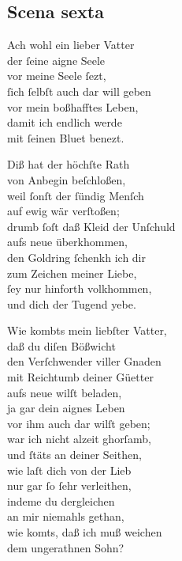 \documentclass{ees}
\newenvironment{lyrics}[1]{%
  \subsection{#1}\nopagebreak%
  \begin{lyricslist}%
  \let\voice\item%
}{%
  \end{lyricslist}%
}
\newcommand\voiceSohn{\voice[Sohn]}
\newcommand\voiceGehorsame{\voice[Geh. Sohn]}
\newcommand\voiceVater{\voice[Vatter]}
\begin{document}
\clearpage
\begin{lyrics}{Scena sexta}
  \voiceSohn
  Ach wohl ein lieber Vatter\\
  der ſeine aigne Seele\\
  vor meine Seele ſezt,\\
  ſich ſelbſt auch dar will geben\\
  vor mein boßhafftes Leben,\\
  damit ich endlich werde\\
  mit ſeinen Bluet benezt.

  \voiceVater
  Diß hat der höchſte Rath\\
  von Anbegin beſchloßen,\\
  weil ſonſt der ſündig Menſch\\
  auf ewig wär verſtoßen;\\
  drumb ſoſt daß Kleid der Unſchuld\\
  aufs neue überkhommen,\\
  den Goldring ſchenkh ich dir\\
  zum Zeichen meiner Liebe,\\
  ſey nur hinforth volkhommen,\\
  und dich der Tugend yebe.

  \voiceGehorsame
  Wie kombts mein liebſter Vatter,\\
  daß du diſen Bößwicht\\
  den Verſchwender viller Gnaden\\
  mit Reichtumb deiner Güetter\\
  aufs neue wilſt beladen,\\
  ja gar dein aignes Leben\\
  vor ihm auch dar wilſt geben;\\
  war ich nicht alzeit ghorſamb,\\
  und ſtäts an deiner Seithen,\\
  wie laſt dich von der Lieb\\
  nur gar ſo ſehr verleithen,\\
  indeme du dergleichen\\
  an mir niemahls gethan,\\
  wie komts, daß ich muß weichen\\
  dem ungerathnen Sohn?


\end{lyrics}
\end{document}
